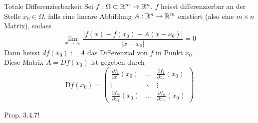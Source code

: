 \begin{Definition}{Totale Differenzierbarkeit}{}
	Sei $f: \Omega \subset \mathbb{R}^m \to \mathbb{R}^n$. $f$ heisst differenzierbar an der Stelle $x_0 \in \Omega$, falls eine lineare Abbildung $A: \mathbb{R}^n \to \mathbb{R}^m$ existiert (also eine $m \times n$ Matrix), sodass \[\lim_{x \to x_0} \frac{|f(x) - f(x_0) - A(x - x_0)|}{|x - x_0|} = 0\] Dann heisst $df(x_0) := A$ das Differenzial von $f$ in Punkt $x_0$. \\
	Diese Matrix $A = Df(x_0)$ ist gegeben durch
	\[
		\text{D}f(x_0) =
        \begin{pmatrix}
            \frac{\partial f_1}{\partial x_1}(x_0)&\hdots&\frac{\partial f_1}{\partial x_n}(x_0)\\
            \vdots&\ddots&\vdots\\
            \frac{\partial f_m}{\partial x_1}(x_0)&\hdots&\frac{\partial f_n}{\partial x_m}(x_0)
        \end{pmatrix}
    \]
\end{Definition}

Prop. 3.4.7!

